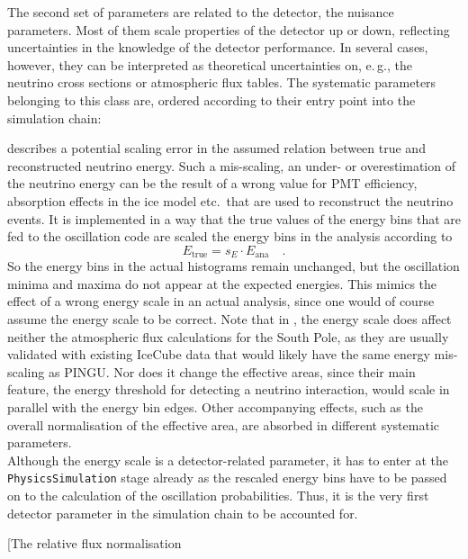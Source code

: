 The second set of parameters are related to the detector, \ie the
nuisance parameters. Most of them scale properties of the detector up or down, 
reflecting uncertainties in the knowledge of the detector performance. In 
several cases, however, they can be interpreted as theoretical uncertainties 
on, e.\,g., the neutrino cross sections or atmospheric flux tables. The
systematic parameters belonging to this class are, ordered according to their
entry point into the simulation chain:

\begin{description}
 \item[The energy scale $\mathbf{s_E}$] describes a potential scaling error
  in the assumed relation 
  between true and reconstructed neutrino energy. Such a mis-scaling, \ie
  an under- or overestimation of the neutrino energy can be the result of a
  wrong value for \eg PMT efficiency, absorption effects in the ice model etc.\ 
  that are used to reconstruct the neutrino events.
  It is implemented in a way that the true values of the energy bins that are 
  fed to the oscillation code are scaled \wrt the energy bins in the analysis 
  according to
  \begin{equation}
   E_\mathrm{true} = s_E\cdot E_\mathrm{ana}\quad.
  \end{equation}
  So the energy bins in the actual histograms remain unchanged, but the 
  oscillation minima and maxima do not appear at the expected energies. This 
  mimics the effect of a wrong energy scale in an actual analysis, since
  one would of course assume the energy scale to be correct. Note that in 
  \papa, the energy scale does affect neither the atmospheric flux calculations
  for the South Pole, as they are usually validated with existing IceCube
  data that would likely have the same energy mis-scaling as PINGU. Nor does it 
  change the
  effective areas, since their main feature, the energy threshold for 
  detecting a neutrino interaction, would scale in parallel with the energy bin 
  edges. Other accompanying effects, such as the overall normalisation of the 
  effective area, are absorbed in different systematic parameters. \\
  Although the energy scale is a detector-related parameter, it has to enter at 
  the \texttt{PhysicsSim\-ul\-ation} stage already as the rescaled energy bins 
  have to be passed on to the calculation of the oscillation probabilities. 
  Thus, it is the very first detector parameter in the simulation chain to be 
  accounted for.
 \item[The relative flux normalisation 

\end{description}
